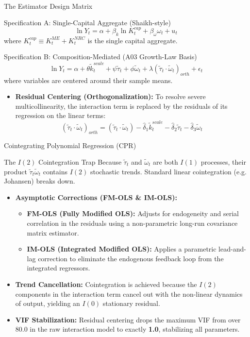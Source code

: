 \documentclass[10pt]{beamer}
\begin{document}
\begin{frame}{The Estimator Design Matrix}
  \begin{block}{Specification A: Single-Capital Aggregate (Shaikh-style)}
    $$\ln Y_t = \alpha + \beta_k \ln K^{cap}_t + \beta_{\omega} \omega_t + u_t$$
    where $K^{cap}_t \equiv K^{ME}_t + K^{NRC}_t$ is the single capital aggregate.
  \end{block}
  \begin{block}{Specification B: Composition-Mediated (A03 Growth-Law Basis)}
    $$\ln Y_t = \alpha + \theta \tilde{k}^{scale}_t + \psi \tilde{\tau}_t + \phi \tilde{\omega}_t + \lambda (\tilde{\tau}_t \cdot \tilde{\omega}_t)_{orth} + \epsilon_t$$
    where variables are centered around their sample means.
  \end{block}
  \begin{itemize}
    \item \textbf{Residual Centering (Orthogonalization):}
      To resolve severe multicollinearity, the interaction term is replaced by the residuals of its regression on the linear terms:
      $$(\tilde{\tau}_t \cdot \tilde{\omega}_t)_{orth} = (\tilde{\tau}_t \cdot \tilde{\omega}_t) - \hat{\delta}_1 \tilde{k}^{scale}_t - \hat{\delta}_2 \tilde{\tau}_t - \hat{\delta}_3 \tilde{\omega}_t$$
  \end{itemize}
\end{frame}

\begin{frame}{Cointegrating Polynomial Regression (CPR)}
  \begin{block}{The $I(2)$ Cointegration Trap}
    Because $\tilde{\tau}_t$ and $\tilde{\omega}_t$ are both $I(1)$ processes, their product $\tilde{\tau}_t \tilde{\omega}_t$ contains $I(2)$ stochastic trends. Standard linear cointegration (e.g. Johansen) breaks down.
  \end{block}
  \begin{itemize}
    \item \textbf{Asymptotic Corrections (FM-OLS \& IM-OLS):}
      \begin{itemize}
        \item \textbf{FM-OLS (Fully Modified OLS):} Adjusts for endogeneity and serial correlation in the residuals using a non-parametric long-run covariance matrix estimator.
        \item \textbf{IM-OLS (Integrated Modified OLS):} Applies a parametric lead-and-lag correction to eliminate the endogenous feedback loop from the integrated regressors.
      \end{itemize}
    \item \textbf{Trend Cancellation:} Cointegration is achieved because the $I(2)$ components in the interaction term cancel out with the non-linear dynamics of output, yielding an $I(0)$ stationary residual.
    \item \textbf{VIF Stabilization:} Residual centering drops the maximum VIF from over 80.0 in the raw interaction model to exactly \textbf{1.0}, stabilizing all parameters.
  \end{itemize}
\end{frame}
\end{document}
